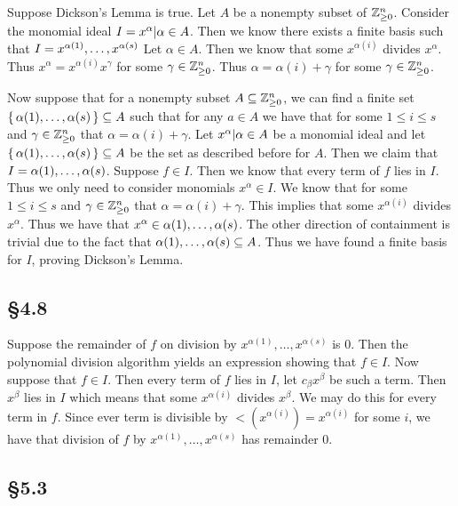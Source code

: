 \documentclass[letterpaper]{article}
\begin{document}
Suppose Dickson's Lemma is true.
Let $A$ be a nonempty subset of $\mathbb{Z}_{\geq 0}^{n}$.
Consider the monomial ideal $I = \gen{x^{\alpha} | \alpha \in A}$.
Then we know there exists a finite basis such that $I = \gen{x^{\alpha(1)}, \ldots, x^{\alpha(s)}}$ Let $\alpha \in A$.
Then we know that some $x^{\alpha(i)}$ divides $x^{\alpha}$.
Thus $x^{\alpha} = x^{\alpha(i)} x^{\gamma}$ for some $\gamma \in \mathbb{Z}_{\geq 0}^{n}$.
Thus $\alpha = \alpha(i) + \gamma$ for some $\gamma \in \mathbb{Z}_{\geq 0}^{n}$.

Now suppose that for a nonempty subset $A \subseteq \mathbb{Z}_{\geq 0}^{n}$, we can find a finite set $\set{\alpha(1), \ldots, \alpha(s)} \subseteq A$ such that for any $a \in A$ we have that for some $1 \leq i \leq s$ and $\gamma \in \mathbb{Z}_{\geq 0}^{n}$ that $\alpha = \alpha(i) + \gamma$.
Let $\gen{x^{\alpha} | \alpha \in A}$ be a monomial ideal and let $\set{\alpha(1), \ldots, \alpha(s)} \subseteq A$ be the set as described before for $A$.
Then we claim that $I = \gen{\alpha(1), \ldots, \alpha(s)}$.
Suppose $f \in I$.
Then we know that every term of $f$ lies in $I$.
Thus we only need to consider monomials $x^{\alpha} \in I$.
We know that for some $1 \leq i \leq s$ and $\gamma \in \mathbb{Z}_{\geq 0}^{n}$ that $\alpha = \alpha(i) + \gamma$.
This implies that some $x^{\alpha(i)}$ divides $x^{\alpha}$.
Thus we have that $x^{\alpha} \in \gen{\alpha(1), \ldots, \alpha(s)}$.
The other direction of containment is trivial due to the fact that $\gen{\alpha(1), \ldots, \alpha(s)} \subseteq A$.
Thus we have found a finite basis for $I$, proving Dickson's Lemma.

\subsection*{\S 4.8}

Suppose the remainder of $f$ on division by $x^{\alpha(1)}, \ldots, x^{\alpha(s)}$ is $0$.
Then the polynomial division algorithm yields an expression showing that $f \in I$.
Now suppose that $f \in I$.
Then every term of $f$ lies in $I$, let $c_{\beta}x^{\beta}$ be such a term.
Then $x^{\beta}$ lies in $I$ which means that some $x^{\alpha(i)}$ divides $x^{\beta}$.
We may do this for every term in $f$.
Since ever term is divisible by $\lt(x^{\alpha(i)}) = x^{\alpha(i)}$ for some $i$, we have that division of $f$ by $x^{\alpha(1)}, \ldots, x^{\alpha(s)}$ has remainder $0$.

\subsection*{\S 5.3}
\end{document}
